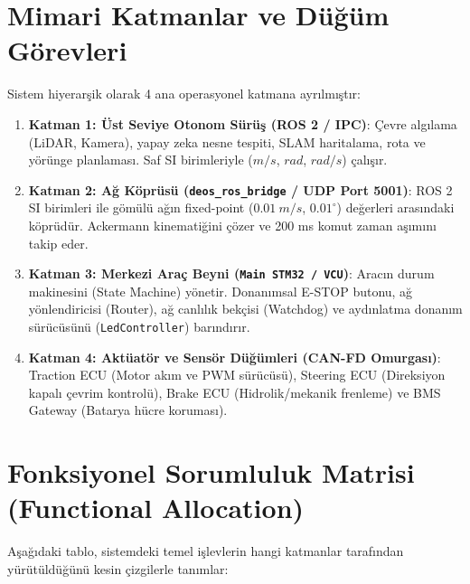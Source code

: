 \documentclass[a4paper,11pt]{article}
\begin{document}
\section{Mimari Katmanlar ve Düğüm Görevleri}

Sistem hiyerarşik olarak 4 ana operasyonel katmana ayrılmıştır:

\begin{enumerate}
    \item \textbf{Katman 1: Üst Seviye Otonom Sürüş (ROS 2 / IPC)}:
    Çevre algılama (LiDAR, Kamera), yapay zeka nesne tespiti, SLAM haritalama, rota ve yörünge planlaması. Saf SI birimleriyle ($m/s$, $rad$, $rad/s$) çalışır.
    
    \item \textbf{Katman 2: Ağ Köprüsü (\texttt{deos\_ros\_bridge} / UDP Port 5001)}:
    ROS 2 SI birimleri ile gömülü ağın fixed-point ($0.01\ m/s$, $0.01^\circ$) değerleri arasındaki köprüdür. Ackermann kinematiğini çözer ve 200 ms komut zaman aşımını takip eder.
    
    \item \textbf{Katman 3: Merkezi Araç Beyni (\texttt{Main STM32 / VCU})}:
    Aracın durum makinesini (State Machine) yönetir. Donanımsal E-STOP butonu, ağ yönlendiricisi (Router), ağ canlılık bekçisi (Watchdog) ve aydınlatma donanım sürücüsünü (\texttt{LedController}) barındırır.
    
    \item \textbf{Katman 4: Aktüatör ve Sensör Düğümleri (CAN-FD Omurgası)}:
    Traction ECU (Motor akım ve PWM sürücüsü), Steering ECU (Direksiyon kapalı çevrim kontrolü), Brake ECU (Hidrolik/mekanik frenleme) ve BMS Gateway (Batarya hücre koruması).
\end{enumerate}

\clearpage

\section{Fonksiyonel Sorumluluk Matrisi (Functional Allocation)}

Aşağıdaki tablo, sistemdeki temel işlevlerin hangi katmanlar tarafından yürütüldüğünü kesin çizgilerle tanımlar:
\end{document}
